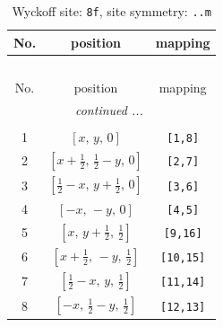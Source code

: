 \documentclass[fleqn,8pt]{jsarticle}
\begin{document}
\begin{longtable}{ccc}
\caption{Wyckoff site: {\tt 8f}, site symmetry: {\tt ..m}}
 \\
 \hline \hline
No. & position & mapping \\ \hline \endfirsthead

\multicolumn{2}{l}{\tablename\ \thetable{}} \\
 \hline \hline
No. & position & mapping \\ \hline \endhead

 \hline \hline
\multicolumn{2}{r}{\footnotesize\it continued ...} \\ \endfoot

 \hline \hline
\multicolumn{2}{r}{} \\ \endlastfoot

1 & $\left[ x,\, y,\, 0 \right]$ & {\tt [1,8]} \\ \hline
2 & $\left[ x + \frac{1}{2},\, \frac{1}{2} - y,\, 0 \right]$ & {\tt [2,7]} \\ \hline
3 & $\left[ \frac{1}{2} - x,\, y + \frac{1}{2},\, 0 \right]$ & {\tt [3,6]} \\ \hline
4 & $\left[ - x,\, - y,\, 0 \right]$ & {\tt [4,5]} \\ \hline
5 & $\left[ x,\, y + \frac{1}{2},\, \frac{1}{2} \right]$ & {\tt [9,16]} \\ \hline
6 & $\left[ x + \frac{1}{2},\, - y,\, \frac{1}{2} \right]$ & {\tt [10,15]} \\ \hline
7 & $\left[ \frac{1}{2} - x,\, y,\, \frac{1}{2} \right]$ & {\tt [11,14]} \\ \hline
8 & $\left[ - x,\, \frac{1}{2} - y,\, \frac{1}{2} \right]$ & {\tt [12,13]} \\
\end{longtable}
\renewcommand{\arraystretch}{1.2}
\end{document}

